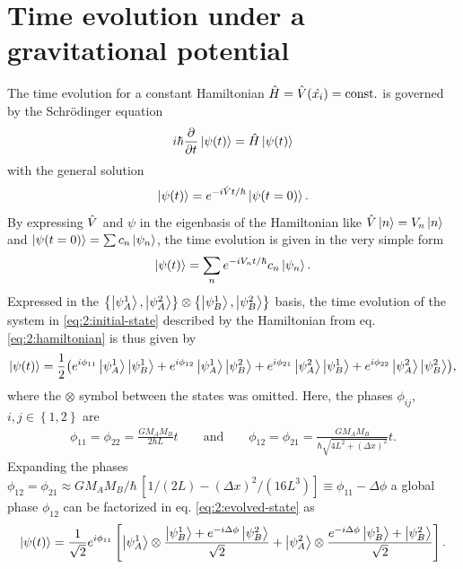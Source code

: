 \section{Time evolution under a gravitational potential}
The time evolution for a constant Hamiltonian $\hat{H} = \hat{V}(\hat{x_i}) = \mathrm{const.}$ is governed by the Schrödinger equation
\begin{equation}
  i\hbar \pdv{t}\ket{\psi(t)} = \hat{H} \ket{\psi(t)}
\end{equation}
with the general solution
\begin{equation}
  \ket{\psi(t)} = e^{-i \hat{V} t / \hbar} \ket{\psi(t=0)} .
\end{equation}
By expressing $\hat{V}$ and $\psi$ in the eigenbasis of the Hamiltonian like $\hat{V}\ket{n} = V_n \ket{n}$ and $\ket{\psi(t=0)} = \sum c_n \ket{\psi_n}$, the time evolution is given in the very simple form
\begin{equation}
  \ket{\psi(t)} = \sum_n e^{-i V_n t /\hbar} c_n \ket{\psi_n} .
\end{equation}
Expressed in the $\left\{ \ket{\psi_A^1}, \ket{\psi_A^2} \right\}\otimes \left\{ \ket{\psi_B^1}, \ket{\psi_B^2} \right\}$ basis, the time evolution of the system in \eqref{eq:2:initial-state} described by the Hamiltonian from eq. \eqref{eq:2:hamiltonian} is thus given by
\begin{equation}\label{eq:2:evolved-state}
  \ket{\psi(t)} = \frac{1}{2}\bigl(
    e^{i\phi_{11}} \ket{\psi_A^1}\ket{\psi_B^1} 
    + e^{i\phi_{12}} \ket{\psi_A^1}\ket{\psi_B^2}
    + e^{i\phi_{21}} \ket{\psi_A^2}\ket{\psi_B^1} 
    + e^{i\phi_{22}} \ket{\psi_A^2}\ket{\psi_B^2} \bigr) ,
\end{equation}
where the $\otimes$ symbol between the states was omitted.
Here, the phases $\phi_{ij}$, $i,j \in \left\{1,2\right\}$ are
\begin{align}
  \phi_{11}=\phi_{22} = \frac{G M_A M_B}{2\hbar L}t 
  \qquad \text{and} \qquad 
  \phi_{12}=\phi_{21} = \frac{G M_A M_B}{\hbar \sqrt{4L^2 + (\Delta x)^2}}t.
\end{align}
Expanding the phases $\phi_{12} = \phi_{21} \approx G M_A M_B/\hbar \, \left[ 1/(2L) - (\Delta x)^2/(16L^3) \right] \equiv \phi_{11} - \Delta \phi$ a global phase $\phi_{12}$ can be factorized in eq. \eqref{eq:2:evolved-state} as
\begin{equation}
  \ket{\psi(t)} = \frac{1}{\sqrt{2}}e^{i\phi_{11}}\left[ 
    \ket{\psi_A^1} \otimes \frac{\ket{\psi_B^1} + e^{-i\Delta\phi} \ket{\psi_B^2}}{\sqrt{2}}
    + \ket{\psi_A^2} \otimes \frac{e^{-i\Delta\phi} \ket{\psi_B^1} + \ket{\psi_B^2}}{\sqrt{2}} \right] .
\end{equation}
